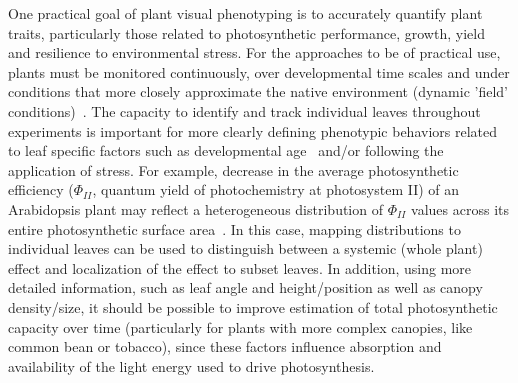 One practical goal of plant visual phenotyping is to accurately quantify plant traits, particularly those related to photosynthetic performance, growth, yield and resilience to environmental stress.
For the approaches to be of practical use, plants must be monitored continuously, over developmental time scales and under conditions that more closely approximate the native environment (dynamic 'field' conditions)~\cite{fahlgren2015lights,walter2015plant}.
%
The capacity to identify and track individual leaves throughout experiments is important for more clearly defining phenotypic behaviors related to leaf specific factors such as developmental age~\cite{schottler2015photosynthetic} and/or following the application of stress.
For example, decrease in the average photosynthetic efficiency ($\Phi_{II}$, quantum yield of photochemistry at photosystem II) of an Arabidopsis plant may reflect a heterogeneous distribution of $\Phi_{II}$ values across its entire photosynthetic surface area~\cite{oxborough2004imaging}.
In this case, mapping distributions to individual leaves can be used to distinguish between a systemic (whole plant) effect and localization of the effect to subset leaves.
%
In addition, using more detailed information, such as leaf angle and height/position as well as canopy density/size, it should be possible to improve estimation of total photosynthetic capacity over time (particularly for plants with more complex canopies, like common bean or tobacco), since these factors influence absorption and availability of the light energy used to drive photosynthesis.

